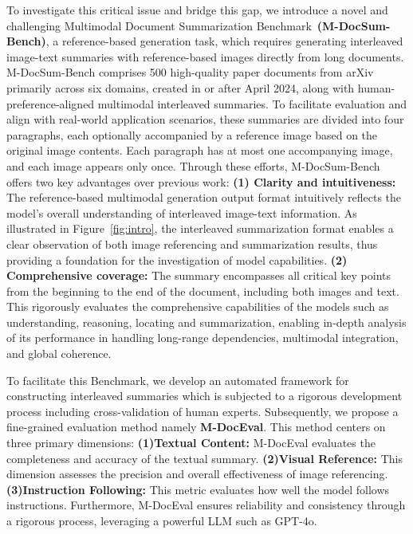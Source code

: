 To investigate this critical issue and bridge this gap, we introduce a novel and challenging Multimodal Document Summarization Benchmark~\textbf{(M-DocSum-Bench)}, a reference-based generation task, which requires generating interleaved image-text summaries with reference-based images directly from long documents. 
M-DocSum-Bench comprises 500 high-quality paper documents from arXiv primarily across six domains, created in or after April 2024, along with human-preference-aligned multimodal interleaved summaries.
To facilitate evaluation and align with real-world application scenarios, these summaries are divided into four paragraphs, each optionally accompanied by a reference image based on the original image contents.
Each paragraph has at most one accompanying image, and each image appears only once. 
Through these efforts, M-DocSum-Bench offers two key advantages over previous work: 
\textbf{(1) Clarity and intuitiveness:} The reference-based multimodal generation output format intuitively reflects the model's overall understanding of interleaved image-text information. 
As illustrated in Figure~\ref{fig:intro}, the interleaved summarization format enables a clear observation of both image referencing and summarization results, thus providing a foundation for the investigation of model capabilities. 
\textbf{(2) Comprehensive coverage:} The summary encompasses all critical key points from the beginning to the end of the document, including both images and text. 
This rigorously evaluates the comprehensive capabilities of the models such as understanding, reasoning, locating and summarization, enabling in-depth analysis of its performance in handling long-range dependencies, multimodal integration, and global coherence.

To facilitate this Benchmark, we develop an automated framework for constructing interleaved summaries which is subjected to a rigorous development process including cross-validation of human experts. 
Subsequently, we propose a fine-grained evaluation method namely \textbf{M-DocEval}. 
This method centers on three primary dimensions:
\textbf{(1)Textual Content:} M-DocEval evaluates the completeness and accuracy of the textual summary. 
\textbf{(2)Visual Reference:} This dimension assesses the precision and overall effectiveness of image referencing.
\textbf{(3)Instruction Following:} This metric evaluates how well the model follows instructions.
Furthermore, M-DocEval ensures reliability and consistency through a rigorous process, leveraging a powerful LLM such as GPT-4o.

